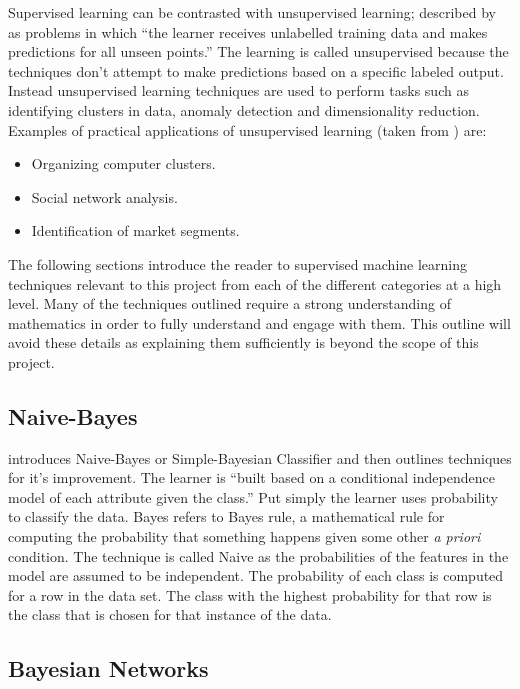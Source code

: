 Supervised learning can be contrasted with unsupervised learning; described by \cite{mohri2012foundations} as problems in which ``the learner receives unlabelled training data and makes predictions for all unseen points.'' The learning is called unsupervised because the techniques don't attempt to make predictions based on a specific labeled output. Instead unsupervised learning techniques are used to perform tasks such as identifying clusters in data, anomaly detection and dimensionality reduction. Examples of practical applications of unsupervised learning (taken from \cite{ng2000cs229}) are:

\begin{itemize}
  \item Organizing computer clusters.
  \item Social network analysis.
  \item Identification of market segments.
\end{itemize}

The following sections introduce the reader to supervised machine learning techniques relevant to this project from each of the different categories at a high level. Many of the techniques outlined require a strong understanding of mathematics in order to fully understand and engage with them. This outline will avoid these details as explaining them sufficiently is beyond the scope of this project.

\subsection{Naive-Bayes}
\cite{kohavi1997improving} introduces Naive-Bayes or Simple-Bayesian Classifier and then outlines techniques for it's improvement. The learner is ``built based on a conditional independence model of each attribute given the class.'' Put simply the learner uses probability to classify the data. Bayes refers to Bayes rule, a mathematical rule for computing the probability that something happens given some other \textit{a priori} condition. The technique is called Naive as the probabilities of the features in the model are assumed to be independent. The probability of each class is computed for a row in the data set. The class with the highest probability for that row is the class that is chosen for that instance of the data.

\subsection{Bayesian Networks}

